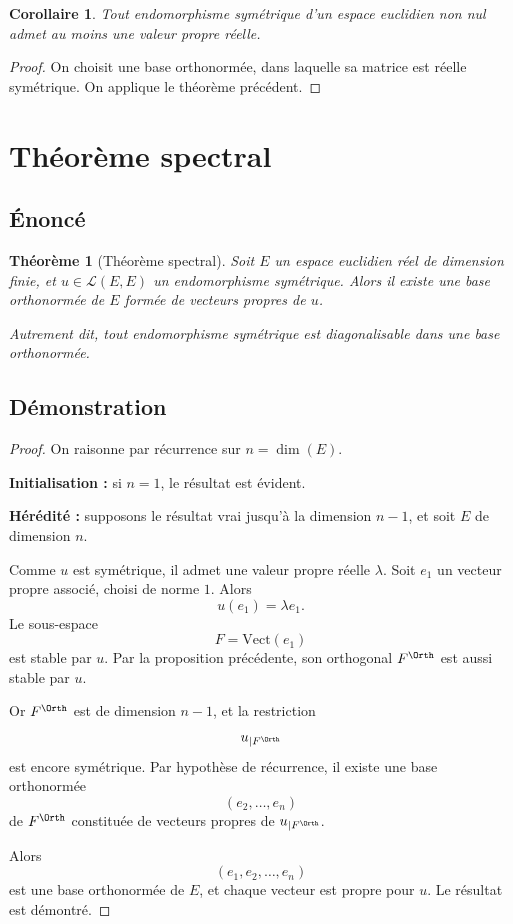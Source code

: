 \documentclass[11pt,a4paper]{article}
\newtheorem{theoreme}[definition]{Théorème}
\newtheorem{corollaire}[definition]{Corollaire}
\theoremstyle{remark}
\newcommand{\Vect}{\mathrm{Vect}}
\begin{document}
\begin{corollaire}
Tout endomorphisme symétrique d’un espace euclidien non nul admet au moins une valeur propre réelle.
\end{corollaire}

\begin{proof}
On choisit une base orthonormée, dans laquelle sa matrice est réelle symétrique. On applique le théorème précédent.
\end{proof}

\section{Théorème spectral}

\subsection{Énoncé}

\begin{theoreme}[Théorème spectral]
Soit \(E\) un espace euclidien réel de dimension finie, et \(u\in \mathcal L(E,E)\) un endomorphisme symétrique. Alors il existe une base orthonormée de \(E\) formée de vecteurs propres de \(u\).

Autrement dit, tout endomorphisme symétrique est diagonalisable dans une base orthonormée.
\end{theoreme}

\subsection{Démonstration}

\begin{proof}
On raisonne par récurrence sur \(n=\dim(E)\).

\textbf{Initialisation :} si \(n=1\), le résultat est évident.

\textbf{Hérédité :} supposons le résultat vrai jusqu’à la dimension \(n-1\), et soit \(E\) de dimension \(n\).

Comme \(u\) est symétrique, il admet une valeur propre réelle \(\lambda\). Soit \(e_1\) un vecteur propre associé, choisi de norme \(1\). Alors
\[
u(e_1)=\lambda e_1.
\]
Le sous-espace
\[
F=\Vect(e_1)
\]
est stable par \(u\). Par la proposition précédente, son orthogonal \(F^\Orth\) est aussi stable par \(u\).

Or \(F^\Orth\) est de dimension \(n-1\), et la restriction
\[
u_{|F^\Orth}
\]
est encore symétrique. Par hypothèse de récurrence, il existe une base orthonormée
\[
(e_2,\dots,e_n)
\]
de \(F^\Orth\) constituée de vecteurs propres de \(u_{|F^\Orth}\).

Alors
\[
(e_1,e_2,\dots,e_n)
\]
est une base orthonormée de \(E\), et chaque vecteur est propre pour \(u\). Le résultat est démontré.
\end{proof}
\end{document}
